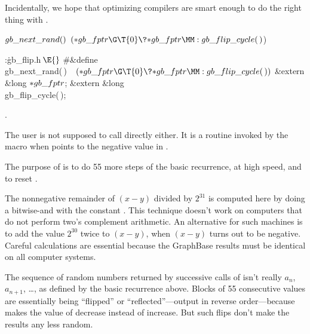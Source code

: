 Incidentally, we hope that optimizing compilers are smart enough to
do the right thing with .

\Y\B\4\D$\\{gb\_next\_rand}()$ \5
$({*}\\{gb\_fptr}\G\T{0}\?{*}\\{gb\_fptr}\MM:\\{gb\_flip\_cycle}(\,){}$)\par
\Y\B\4:\.{gb\_flip.h\,}\X${}\E{}$\6
\8\#\&{define} \\{gb\_next\_rand}(\,)\5${}\hbox{\quad}({*}\\{gb\_fptr}\G\T{0}%
\?{*}\\{gb\_fptr}\MM:\\{gb\_flip\_cycle}(\,)){}$\6
\&{extern} \&{long} ${}{*}\\{gb\_fptr}{}$;\6
\&{extern} \&{long} \\{gb\_flip\_cycle}(\,);\par
{}.\fi

The user is not supposed to call  directly either.
It is a routine invoked by the macro  when 
points to the negative value in .

The purpose of  is to do 55 more steps of the basic
recurrence, at high speed, and to reset .

The nonnegative remainder of $(x-y)$ divided by $2^{31}$ is computed here by
doing a bitwise-and with the constant . This technique
doesn't work on computers that do not perform two's complement
arithmetic. An alternative for such machines is to add the value
$2^{30}$ twice to $(x-y)$, when $(x-y)$ turns out to be negative.
Careful calculations are essential because the GraphBase results
must be identical on all computer systems.

The sequence of random numbers returned by successive calls of 
isn't really $a_n$, $a_{n+1}$, \dots, as defined by the basic recurrence above.
Blocks of 55 consecutive values are essentially being ``flipped'' or
``reflected''---output in reverse order---because 
makes the value of  decrease instead of increase.
But such flips don't make the results any less random.

